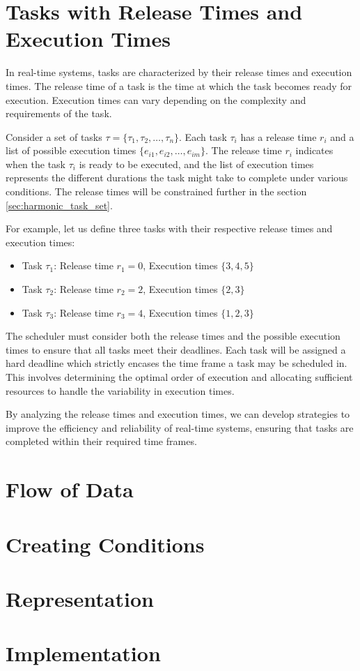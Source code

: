 \section{Tasks with Release Times and Execution Times}
\label{sec:tasks_release_execution}

In real-time systems, tasks are characterized by their release times and execution times.
The release time of a task is the time at which the task becomes ready for execution.
Execution times can vary depending on the complexity and requirements of the task.

Consider a set of tasks \( \tau = \{\tau_1, \tau_2, \ldots, \tau_n\} \).
Each task \( \tau_i \) has a release time \( r_i \) and a list of possible execution times \( \{e_{i1}, e_{i2}, \ldots, e_{im}\} \).
The release time \( r_i \) indicates when the task \( \tau_i \) is ready to be executed, and the list of execution times represents the different durations the task might take to complete under various conditions.
The release times will be constrained further in the section \cref{sec:harmonic_task_set}.

For example, let us define three tasks with their respective release times and execution times:

\begin{itemize}
	\item Task \( \tau_1 \): Release time \( r_1 = 0 \), Execution times \( \{3, 4, 5\} \)
	\item Task \( \tau_2 \): Release time \( r_2 = 2 \), Execution times \( \{2, 3\} \)
	\item Task \( \tau_3 \): Release time \( r_3 = 4 \), Execution times \( \{1, 2, 3\} \)
\end{itemize}

The scheduler must consider both the release times and the possible execution times to ensure that all tasks meet their deadlines.
Each task will be assigned a hard deadline which strictly encases the time frame a task may be scheduled in. 
This involves determining the optimal order of execution and allocating sufficient resources to handle the variability in execution times.

By analyzing the release times and execution times, we can develop strategies to improve the efficiency and reliability of real-time systems, ensuring that tasks are completed within their required time frames.

\section{Flow of Data}
\label{sec:flow_of_data}

\section{Creating Conditions}
\label{sec:creating_conditions}

\section{Representation}
\label{sec:representation}



\section{Implementation}
\label{sec:implementation}